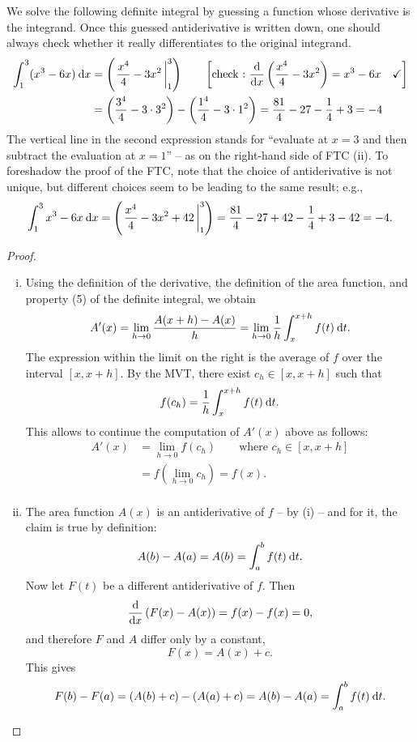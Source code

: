 \begin{example}
We solve the following definite integral by guessing a function whose derivative is the integrand. Once this guessed antiderivative is written down, one should always check whether it really differentiates to the original integrand. 
\begin{equation*}
\begin{split}
\int_{1}^{3} (x^3-6x) \: \mathrm{d} x 
& = \left( \left. \frac{x^4}{4} - 3x^2 \, \right|_{1}^{3} \right) 
	\qquad \left[ \text{check :~} \displaystyle{\frac{\mathrm{d}}{\mathrm{d}x}} \left( \frac{x^4}{4} - 3x^2 \right) 
	= x^3-6x \quad \text{\checkmark} \right] \\
& = \left( \frac{3^4}{4} - 3\cdot 3^2 \right)
- \left( \frac{1^4}{4} - 3\cdot 1^2 \right) 
= \frac{81}{4} - 27 - \frac{1}{4} + 3 = -4
\end{split}
\end{equation*}
The vertical line in the second expression stands for ``evaluate at $x=3$ and then subtract the evaluation at $x=1$'' -- as on the right-hand side of FTC (ii). To foreshadow the proof of the FTC, note that the choice of antiderivative is not unique, but different choices seem to be leading to the same result; e.g.,
\[ \int_{1}^{3} x^3-6x \: \mathrm{d} x = \left( \left. \frac{x^4}{4} - 3x^2 + 42 \, \right|_{1}^{3} \right)
= \frac{81}{4} - 27 + 42 - \frac{1}{4} + 3 - 42 = -4. \]
\end{example}

\begin{proof}
\begin{enumerate}[(i)]
	\item Using the definition of the derivative, the definition of the area function, and property (5) of the definite integral, we obtain
	\[ A'(x) = \lim_{h \to 0} \frac{A(x+h)-A(x)}{h}
	= \lim_{h \to 0} \frac{1}{h} \int_{x}^{x+h} f(t) \: \mathrm{d} t. \]
	The expression within the limit on the right is the average of $f$ over the interval $[x,x+h]$. By the MVT, there exist $c_h\in[x,x+h]$ such that
	\[ f(c_h) = \frac{1}{h} \int_{x}^{x+h} f(t) \: \mathrm{d} t. \]
	This allows to continue the computation of $A'(x)$ above as follows:
	\begin{equation*}
	\begin{split}
	A'(x) & = \lim_{h \to 0} f(c_h) \qquad \text{where~} c_h\in[x,x+h] \\
		  & = f\left(\lim_{h \to 0} c_h \right) = f(x). \\	
	\end{split}
	\end{equation*}
	\item The area function $A(x)$ is an antiderivative of $f$ -- by (i) -- and for it, the claim is true by definition:
	\[ A(b) - A(a) = A(b) = \int_{a}^{b} f(t) \: \mathrm{d} t. \]
	Now let $F(t)$ be a different antiderivative of $f$. Then
	\[ \displaystyle{\frac{\mathrm{d}}{\mathrm{d}x}} \left( F(x) -A(x) \right) = f(x) -f(x) = 0, \]
	and therefore $F$ and $A$ differ only by a constant,
	\[ F(x) = A(x) + c.\]
	This gives
	\[ F(b) - F(a) = (A(b)+c) - (A(a)+c) = A(b)-A(a) = \int_{a}^{b} f(t) \: \mathrm{d} t. \]
\end{enumerate}
\end{proof}

